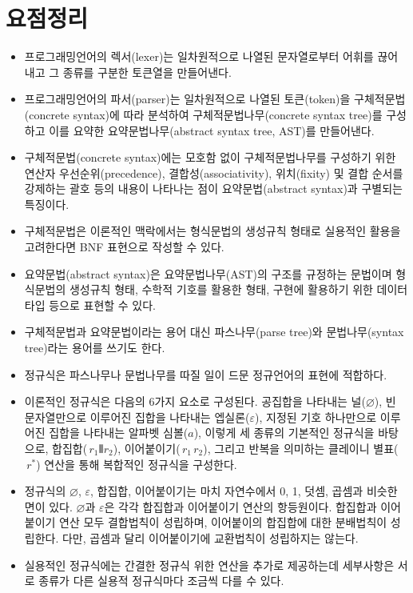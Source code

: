 \section*{요점정리}
\begin{itemize}
\item 프로그래밍언어의 렉서(lexer)는 일차원적으로 나열된 문자열로부터
      어휘를 끊어내고 그 종류를 구분한 토큰열을 만들어낸다.
\item 프로그래밍언어의 파서(parser)는 일차원적으로 나열된
      토큰(token)을 구체적문법(concrete syntax)에 따라 분석하여
      구체적문법나무(concrete syntax tree)를 구성하고 이를 요약한
      요약문법나무(abstract syntax tree, AST)를 만들어낸다.
\item 구체적문법(concrete syntax)에는 모호함 없이 구체적문법나무를
      구성하기 위한 연산자 우선순위(precedence), 결합성(associativity),
      위치(fixity) 및 결합 순서를 강제하는 괄호 등의 내용이 나타나는
      점이 요약문법(abstract syntax)과 구별되는 특징이다.
\item 구체적문법은 이론적인 맥락에서는 형식문법의 생성규칙 형태로
      실용적인 활용을 고려한다면 BNF 표현으로 작성할 수 있다.
\item 요약문법(abstract syntax)은 요약문법나무(AST)의 구조를 규정하는
      문법이며 형식문법의 생성규칙 형태, 수학적 기호를 활용한 형태,
      구현에 활용하기 위한 데이터 타입 등으로 표현할 수 있다.
\item 구체적문법과 요약문법이라는 용어 대신 파스나무(parse tree)와
      문법나무(syntax tree)라는 용어를 쓰기도 한다.
\item 정규식은 파스나무나 문법나무를 따질 일이 드문 정규언어의 표현에 적합하다.
\item 이론적인 정규식은 다음의 6가지 요소로 구성된다.
      공집합을 나타내는 널($\varnothing$),
      빈 문자열만으로 이루어진 집합을 나타내는 엡실론($\varepsilon$),
      지정된 기호 하나만으로 이루어진 집합을 나타내는 알파벳 심볼($a$),
      이렇게 세 종류의 기본적인 정규식을 바탕으로, 합집합($\,r_1 \VERT r_2$),
      이어붙이기($\,r_1\,r_2$), 그리고 반복을 의미하는 클레이니 별표($\,r^{*}$) 연산을
      통해 복합적인 정규식을 구성한다.
\item 정규식의 $\varnothing$, $\varepsilon$, 합집합, 이어붙이기는 마치 자연수에서
      0, 1, 덧셈, 곱셈과 비슷한 면이 있다. $\varnothing$과 $\varepsilon$은
      각각 합집합과 이어붙이기 연산의 항등원이다. 합집합과 이어붙이기 연산
      모두 결합법칙이 성립하며, 이어붙이의 합집합에 대한 분배법칙이 성립한다.
      다만, 곱셈과 달리 이어붙이기에 교환법칙이 성립하지는 않는다.
\item 실용적인 정규식에는 간결한 정규식 위한 연산을 추가로 제공하는데
      세부사항은 서로 종류가 다른 실용적 정규식마다 조금씩 다를 수 있다. 
\end{itemize}


